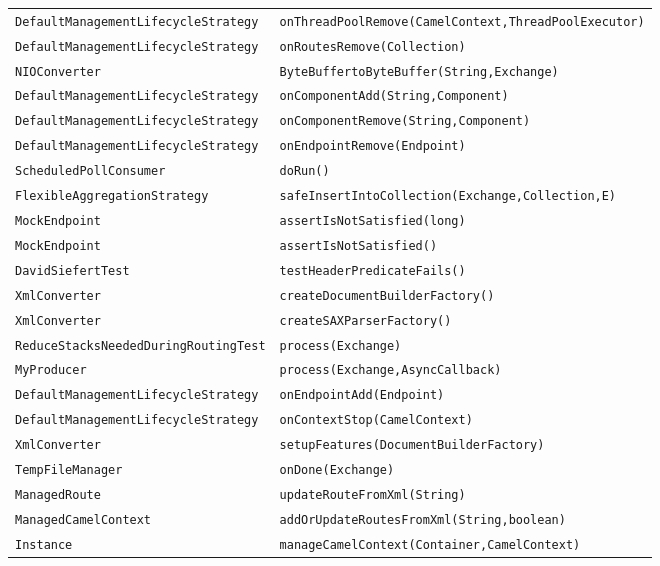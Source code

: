 \begin{center}
\begin{longtable}{ll}
\lstinline/DefaultManagementLifecycleStrategy/&{\lstinline/onThreadPoolRemove(CamelContext,ThreadPoolExecutor)/}\\
\lstinline/DefaultManagementLifecycleStrategy/&{\lstinline/onRoutesRemove(Collection)/}\\
\lstinline/NIOConverter/&{\lstinline/ByteBuffertoByteBuffer(String,Exchange)/}\\
\lstinline/DefaultManagementLifecycleStrategy/&{\lstinline/onComponentAdd(String,Component)/}\\
\lstinline/DefaultManagementLifecycleStrategy/&{\lstinline/onComponentRemove(String,Component)/}\\
\lstinline/DefaultManagementLifecycleStrategy/&{\lstinline/onEndpointRemove(Endpoint)/}\\
\lstinline/ScheduledPollConsumer/&{\lstinline/doRun()/}\\
\lstinline/FlexibleAggregationStrategy/&{\lstinline/safeInsertIntoCollection(Exchange,Collection,E)/}\\
\lstinline/MockEndpoint/&{\lstinline/assertIsNotSatisfied(long)/}\\
\lstinline/MockEndpoint/&{\lstinline/assertIsNotSatisfied()/}\\
\lstinline/DavidSiefertTest/&{\lstinline/testHeaderPredicateFails()/}\\
\lstinline/XmlConverter/&{\lstinline/createDocumentBuilderFactory()/}\\
\lstinline/XmlConverter/&{\lstinline/createSAXParserFactory()/}\\
\lstinline/ReduceStacksNeededDuringRoutingTest/&{\lstinline/process(Exchange)/}\\
\lstinline/MyProducer/&{\lstinline/process(Exchange,AsyncCallback)/}\\
\lstinline/DefaultManagementLifecycleStrategy/&{\lstinline/onEndpointAdd(Endpoint)/}\\
\lstinline/DefaultManagementLifecycleStrategy/&{\lstinline/onContextStop(CamelContext)/}\\
\lstinline/XmlConverter/&{\lstinline/setupFeatures(DocumentBuilderFactory)/}\\
\lstinline/TempFileManager/&{\lstinline/onDone(Exchange)/}\\
\lstinline/ManagedRoute/&{\lstinline/updateRouteFromXml(String)/}\\
\lstinline/ManagedCamelContext/&{\lstinline/addOrUpdateRoutesFromXml(String,boolean)/}\\
\lstinline/Instance/&{\lstinline/manageCamelContext(Container,CamelContext)/}\\

\end{longtable}
\end{center}
